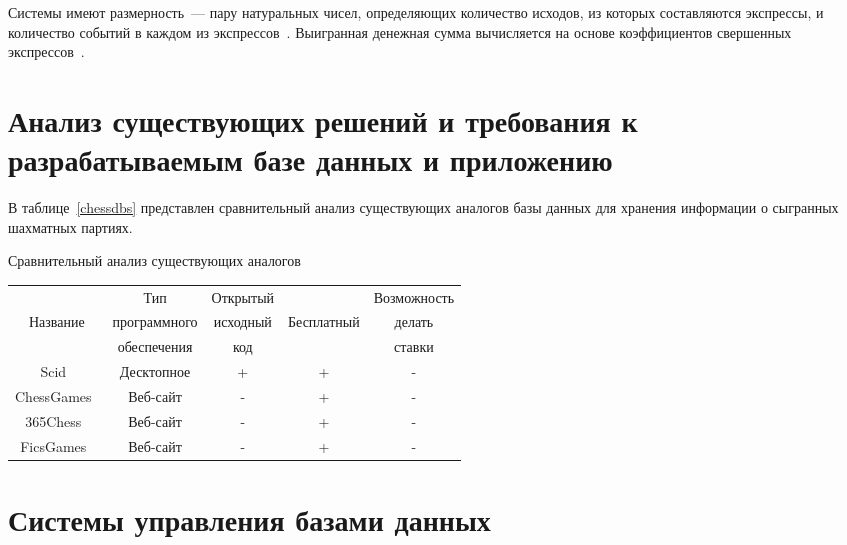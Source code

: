 Системы имеют размерность~--- пару натуральных чисел, определяющих количество исходов, из которых составляются экспрессы, и количество событий в каждом из экспрессов~\cite{bet}.
Выигранная денежная сумма вычисляется на основе коэффициентов свершенных экспрессов~\cite{bet}.

\section[Анализ существующих решений и требования к разрабатываемым базе данных и приложению]{Анализ существующих решений и требования к\\разрабатываемым базе данных и приложению}

В таблице~\ref{chessdbs} представлен сравнительный анализ существующих аналогов базы данных для хранения информации о сыгранных шахматных партиях.
\begin{center}
	\begin{threeparttable}
		\captionsetup{justification=raggedright,singlelinecheck=off}
		\caption{\label{chessdbs}Сравнительный анализ существующих аналогов}
		\centering
		\begin{tabular}{|c|c|c|c|c|}
			\hline
			& Тип & Открытый && Возможность\\
			Название & программного & исходный &  Бесплатный & делать\\
			& обеспечения & код && ставки\\
			\hline
			Scid~\cite{scid} & Десктопное & + & + & -\\
			\hline
			ChessGames~\cite{chessgamescom} & Веб-сайт & - & + & -\\
			\hline
			365Chess~\cite{365chess} & Веб-сайт & - & + & -\\
			\hline
			FicsGames~\cite{fics} & Веб-сайт & - & + & -\\
			\hline
		\end{tabular}
	\end{threeparttable}
\end{center}

\section{Системы управления базами данных}

